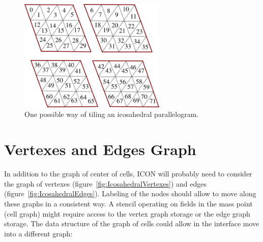 \documentclass{book}
\begin{document}
\begin{figure}[htb!]
	\begin{center}
		\includegraphics[width=7cm]{fig/IcosahedralGridTiling.png}
	\caption{One possible way of tiling an icosahedral parallelogram.}
	\label{fig:IcosahedralTiling}
	\end{center}
\end{figure}
\section{Vertexes and Edges Graph}

In addition to the graph of center of cells, ICON will probably need to consider the graph of vertexes (figure~\ref{fig:IcosahedralVertexes}) and edges (figure~\ref{fig:IcosahedralEdges}). Labeling of the nodes should allow to move
along these graphs in a consistent way. 
A stencil operating on fields in the mass point (cell graph) might require access
to the vertex graph storage or the edge graph storage. 
The data structure of the graph of cells could allow in the interface move into a 
different graph:
\end{document}
